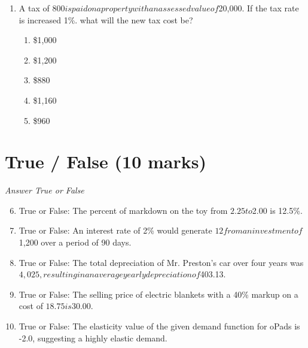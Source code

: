 \documentclass[12pt]{article}
\begin{document}
\begin{enumerate}[label=\arabic*.]
\begin{enumerate}[label=(\alph*)]
    \item Globalisation, Technological, Financial, Accountability
    \item Globalisation, Economic, Legal, Accountability
    \item Privatisation, Technological, Financial, Accountability
    \item Privatisation, Cultural, Legal, Accountability
    \item Nationalisation, Cultural, Environmental, Accountability
\end{enumerate}
\item A tax of $800 is paid on a property with an assessed value of $20,000. If the tax rate is increased 1\%. what will the new tax cost be?
\begin{enumerate}[label=(\alph*)]
    \item \$1,000
    \item \$1,200
    \item \$880
    \item \$1,160
    \item \$960
\end{enumerate}
\end{enumerate}

\section*{True / False (10 marks)}
\textit{Answer True or False}
\begin{enumerate}[label=\arabic*.]
\setcounter{enumi}{5}
\item True or False: The percent of markdown on the toy from $2.25 to $2.00 is 12.5\%.
\item True or False: An interest rate of 2\% would generate $12 from an investment of $1,200 over a period of 90 days.
\item True or False: The total depreciation of Mr. Preston's car over four years was $4,025, resulting in an average yearly depreciation of $403.13.
\item True or False: The selling price of electric blankets with a 40\% markup on a cost of $18.75 is $30.00.
\item True or False: The elasticity value of the given demand function for oPads is -2.0, suggesting a highly elastic demand.
\end{enumerate}
\end{document}

